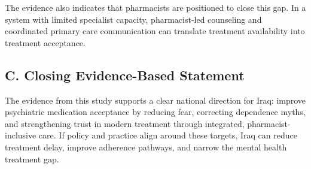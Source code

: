 \documentclass[12pt,a4paper]{article}
\begin{document}
The evidence also indicates that pharmacists are positioned to close this gap. In a system with limited specialist capacity, pharmacist-led counseling and coordinated primary care communication can translate treatment availability into treatment acceptance.

\subsection*{C. Closing Evidence-Based Statement}
The evidence from this study supports a clear national direction for Iraq: improve psychiatric medication acceptance by reducing fear, correcting dependence myths, and strengthening trust in modern treatment through integrated, pharmacist-inclusive care. If policy and practice align around these targets, Iraq can reduce treatment delay, improve adherence pathways, and narrow the mental health treatment gap.

\newpage
\newpage
\end{document}
